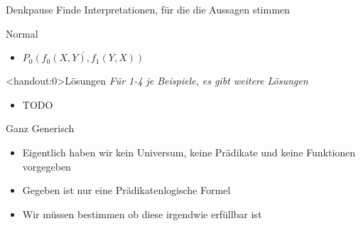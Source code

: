 {
\begin{frame}{Denkpause}
	Finde Interpretationen, für die die Aussagen stimmen
	\begin{block}{Normal}
		\begin{itemize}
			\item $\overline{P_0(f_0(X,Y), f_1(Y,X))}$
		\end{itemize}
	\end{block}
\end{frame}

\begin{frame}<handout:0>{Lösungen}
	\textit{Für 1-4 je Beispiele, es gibt weitere Lösungen}
	\begin{itemize}[<+- | alert@+>]
		\item TODO
	\end{itemize}
\end{frame}
}

\begin{frame}{Ganz Generisch}
	\begin{itemize}[<+->]
		\item Eigentlich haben wir kein Universum, keine  Prädikate und keine Funktionen vorgegeben
		\item Gegeben ist nur eine Prädikatenlogische Formel
		\item Wir müssen bestimmen ob diese irgendwie erfüllbar ist
	\end{itemize}
\end{frame}

